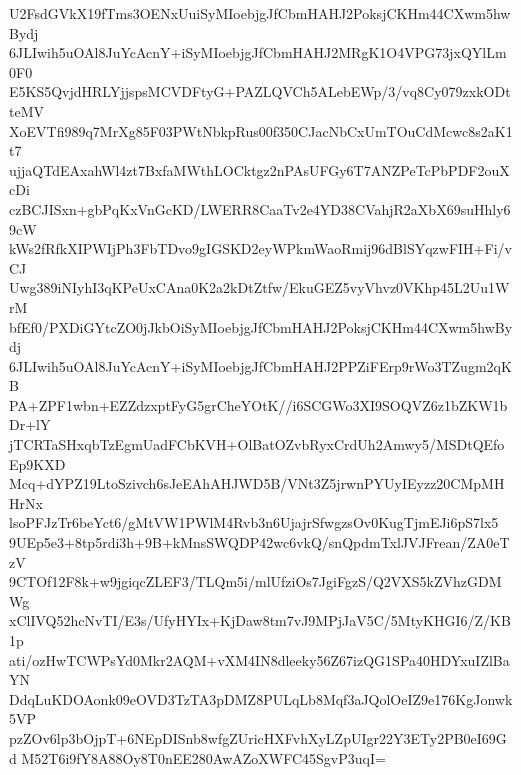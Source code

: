 U2FsdGVkX19fTms3OENxUuiSyMIoebjgJfCbmHAHJ2PoksjCKHm44CXwm5hwBydj
6JLIwih5uOAl8JuYcAcnY+iSyMIoebjgJfCbmHAHJ2MRgK1O4VPG73jxQYlLm0F0
E5KS5QvjdHRLYjjspsMCVDFtyG+PAZLQVCh5ALebEWp/3/vq8Cy079zxkODtteMV
XoEVTfi989q7MrXg85F03PWtNbkpRus00f350CJacNbCxUmTOuCdMcwc8s2aK1t7
ujjaQTdEAxahWl4zt7BxfaMWthLOCktgz2nPAsUFGy6T7ANZPeTcPbPDF2ouXcDi
czBCJISxn+gbPqKxVnGcKD/LWERR8CaaTv2e4YD38CVahjR2aXbX69suHhly69cW
kWs2fRfkXIPWIjPh3FbTDvo9gIGSKD2eyWPkmWaoRmij96dBlSYqzwFIH+Fi/vCJ
Uwg389iNIyhI3qKPeUxCAna0K2a2kDtZtfw/EkuGEZ5vyVhvz0VKhp45L2Uu1WrM
bfEf0/PXDiGYtcZO0jJkbOiSyMIoebjgJfCbmHAHJ2PoksjCKHm44CXwm5hwBydj
6JLIwih5uOAl8JuYcAcnY+iSyMIoebjgJfCbmHAHJ2PPZiFErp9rWo3TZugm2qKB
PA+ZPF1wbn+EZZdzxptFyG5grCheYOtK//i6SCGWo3XI9SOQVZ6z1bZKW1bDr+lY
jTCRTaSHxqbTzEgmUadFCbKVH+OlBatOZvbRyxCrdUh2Amwy5/MSDtQEfoEp9KXD
Mcq+dYPZ19LtoSzivch6sJeEAhAHJWD5B/VNt3Z5jrwnPYUyIEyzz20CMpMHHrNx
lsoPFJzTr6beYct6/gMtVW1PWlM4Rvb3n6UjajrSfwgzsOv0KugTjmEJi6pS7lx5
9UEp5e3+8tp5rdi3h+9B+kMnsSWQDP42wc6vkQ/snQpdmTxlJVJFrean/ZA0eTzV
9CTOf12F8k+w9jgiqcZLEF3/TLQm5i/mlUfziOs7JgiFgzS/Q2VXS5kZVhzGDMWg
xClIVQ52hcNvTI/E3s/UfyHYIx+KjDaw8tm7vJ9MPjJaV5C/5MtyKHGI6/Z/KB1p
ati/ozHwTCWPsYd0Mkr2AQM+vXM4IN8dleeky56Z67izQG1SPa40HDYxuIZlBaYN
DdqLuKDOAonk09eOVD3TzTA3pDMZ8PULqLb8Mqf3aJQolOeIZ9e176KgJonwk5VP
pzZOv6lp3bOjpT+6NEpDISnb8wfgZUricHXFvhXyLZpUIgr22Y3ETy2PB0eI69Gd
M52T6i9fY8A88Oy8T0nEE280AwAZoXWFC45SgvP3uqI=
